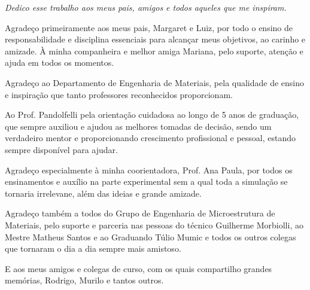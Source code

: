 \documentclass[
	12pt,				%
	openright,			%
	twoside,			%
	a4paper,			%
	chapter=TITLE,		%
	english,			%
	french,				%
	spanish,			%
	brazil,				%
	hyphens,
  oldfontcommands
	]{abntex2}
\theoremstyle{definition}
\theoremstyle{definition}
\begin{document}

    
  

\begin{dedicatoria}
   \vspace*{\fill}
   \centering
   \noindent
   \textit{Dedico esse trabalho aos meus pais, amigos e todos aqueles que me inspiram.} \vspace*{\fill}
\end{dedicatoria}

\begin{agradecimentos}

Agradeço primeiramente aos meus pais, Margaret e Luiz, por todo o ensino de
responsabilidade e disciplina essenciais para alcançar meus objetivos, ao
carinho e amizade. À minha companheira e melhor amiga Mariana, pelo suporte,
atenção e ajuda em todos os momentos.

Agradeço ao Departamento de Engenharia de Materiais, pela qualidade de ensino e
inspiração que tanto professores reconhecidos proporcionam.

Ao Prof. Pandolfelli pela orientação cuidadosa ao longo de 5 anos de graduação, que sempre
auxiliou e ajudou as melhores tomadas de decisão, sendo um verdadeiro mentor e proporcionando
crescimento profissional e pessoal, estando sempre disponível para ajudar.

Agradeço especialmente à minha coorientadora, Prof. Ana Paula, por todos os
ensinamentos e auxílio na parte experimental sem a qual toda a simulação se
tornaria irrelevane, além das ideias e grande amizade.

Agradeço também a todos do Grupo de Engenharia de Microestrutura de Materiais,
pelo suporte e parceria nas pessoas do técnico Guilherme Morbiolli, ao Mestre
Matheus Santos e ao Graduando Túlio Mumic e todos os outros colegas que tornaram
o dia a dia sempre mais amistoso. 

E aos meus amigos e colegas de curso, com os quais compartilho grandes memórias,
Rodrigo, Murilo e tantos outros. 

\end{agradecimentos}
\end{document}
